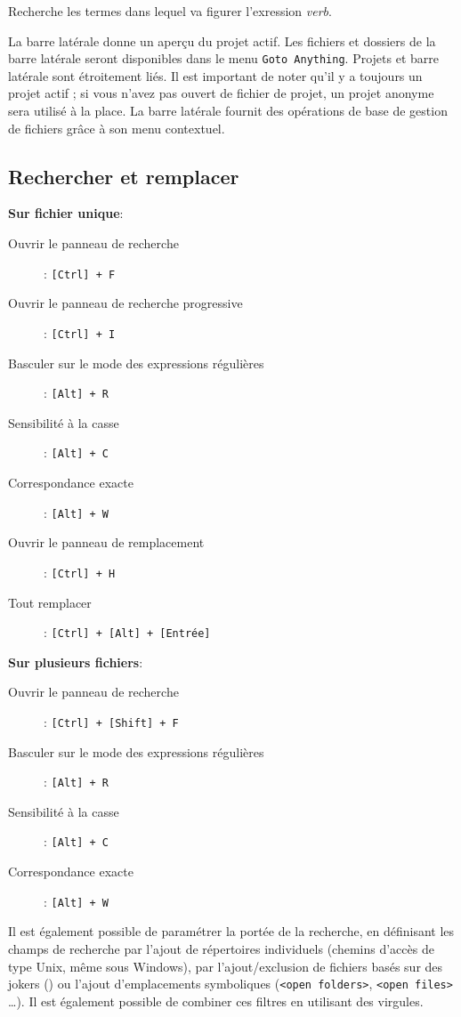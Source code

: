 \documentclass[french,a4paper]{article}
\begin{document}
Recherche les termes dans lequel va figurer l'exression \textit{verb}.
\medskip

La barre latérale donne un aperçu du projet actif. Les fichiers et dossiers de
 la barre latérale seront disponibles dans le menu \texttt{Goto Anything}. 
 Projets et barre latérale sont étroitement liés. Il est important de noter 
 qu'il y a toujours un projet actif ; si vous n'avez pas ouvert de fichier de 
 projet, un projet anonyme sera utilisé à la place. La barre latérale fournit 
 des opérations de base de gestion de fichiers grâce à son menu contextuel. 
\bigskip

\subsection*{Rechercher et remplacer}
\textbf{Sur fichier unique}: \\
\begin{description}
	\item[Ouvrir le panneau de recherche]: \texttt{[Ctrl] + F}
	\item[Ouvrir le panneau de recherche progressive]: \texttt{[Ctrl] + I}
	\item[Basculer sur le mode des expressions régulières]: \texttt{[Alt] + R}
	\item[Sensibilité à la casse]: \texttt{[Alt] + C}
	\item[Correspondance exacte]: \texttt{[Alt] + W}
	\item[Ouvrir le panneau de remplacement]: \texttt{[Ctrl] + H}
	\item[Tout remplacer]: \texttt{[Ctrl] + [Alt] + [Entrée]}
\end{description}
\bigskip

\textbf{Sur plusieurs fichiers}:\\
\begin{description}
	\item[Ouvrir le panneau de recherche]: \texttt{[Ctrl] + [Shift] + F} 
	\item[Basculer sur le mode des expressions régulières]: \texttt{[Alt] + R}
	\item[Sensibilité à la casse]: \texttt{[Alt] + C}
	\item[Correspondance exacte]: \texttt{[Alt] + W}
\end{description}
\medskip

Il est également possible de paramétrer la portée de la recherche, en
 définisant les champs de recherche par l'ajout de répertoires individuels
 (chemins d'accès de type Unix, même sous Windows), par l'ajout/exclusion de
 fichiers basés sur des jokers (\og *\fg{}) ou l'ajout d'emplacements 
 symboliques (\texttt{<open folders>}, \texttt{<open files>} \dots). Il est 
 également possible de combiner ces filtres en utilisant des virgules.
\medskip
\end{document}

